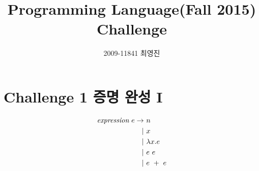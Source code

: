 \documentclass[a4paper]{article}
\begin{document}
\title{Programming Language(Fall 2015) Challenge}
\author{2009-11841 최영진}
\maketitle


\section*{Challenge 1 증명 완성 I}
\begin{align*}
\emph{expression}\ e \rightarrow\ & n \\
| \ & x \\
| \ & \lambda x. e \\
| \ & e\ e \\
| \ & e\ +\ e
\end{align*}
\end{document}

